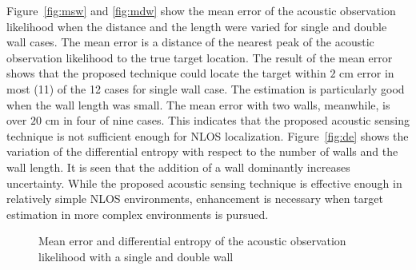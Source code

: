 Figure~\ref{fig:msw} and \ref{fig:mdw} show the mean error of the acoustic observation likelihood when the distance and the length were varied for single and double wall cases.  The mean error is a distance of the nearest peak of the acoustic observation likelihood to the true target location. The result of the mean error shows that the proposed technique could locate the target within $2$ cm error in most (11) of the 12 cases for single wall case.  The estimation is particularly good when the wall length was small.  The mean error with two walls, meanwhile, is over $20$ cm in four of nine cases.  This indicates that the proposed acoustic sensing technique is not sufficient enough for NLOS localization.  Figure~\ref{fig:de} shows the variation of the differential entropy with respect to the number of walls and the wall length.  It is seen that the addition of a wall dominantly increases uncertainty.  While the proposed acoustic sensing technique is effective enough in relatively simple NLOS environments, enhancement is necessary when target estimation in more complex environments is pursued.  

\begin{figure}[ht]
	\centering
	\caption{Mean error and differential entropy of the acoustic observation likelihood with a single and double wall}
	\label{fig:EUSW}
\end{figure}

